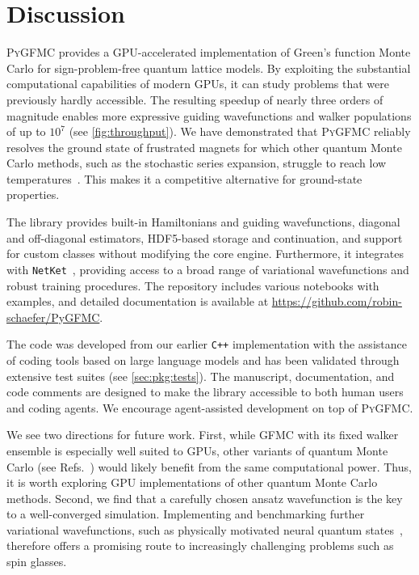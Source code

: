 \documentclass{SciPost}
\providecommand{\PyGFMC}{\textsc{PyGFMC}}
\providecommand{\repo}{\href{https://github.com/robin-schaefer/PyGFMC}{https://github.com/robin-schaefer/PyGFMC}}
\begin{document}
\section{Discussion}\label{sec:discussion}
\PyGFMC{} provides a GPU-accelerated implementation of Green's function Monte Carlo for sign-problem-free quantum lattice models.
%
By exploiting the substantial computational capabilities of modern GPUs, it can study problems that were previously hardly accessible.
%
The resulting speedup of nearly three orders of magnitude enables more expressive guiding wavefunctions and walker populations of up to $10^7$ (see \autoref{fig:throughput}).
%
We have demonstrated that \PyGFMC{} reliably resolves the ground state of frustrated magnets for which other quantum Monte Carlo methods, such as the stochastic series expansion, struggle to reach low temperatures~\cite{kato_numerical_2015,huang_extended_2020}.
%
This makes it a competitive alternative for ground-state properties.

The library provides built-in Hamiltonians and guiding wavefunctions, diagonal and off-diagonal estimators, HDF5-based storage and continuation, and support for custom classes without modifying the core engine.
%
Furthermore, it integrates with \texttt{NetKet}~\cite{SciPostPhysCodeb.7,SciPostPhysCodeb.7-r3.4}, providing access to a broad range of variational wavefunctions and robust training procedures.
%
The repository includes various notebooks with examples, and detailed documentation is available at \repo{}.

The code was developed from our earlier \texttt{C++} implementation with the assistance of coding tools based on large language models and has been validated through extensive test suites (see \autoref{sec:pkg:tests}). 
%
The manuscript, documentation, and code comments are designed to make the library accessible to both human users and coding agents.
%
We encourage agent-assisted development on top of \PyGFMC{}.

We see two directions for future work.
%
First, while GFMC with its fixed walker ensemble is especially well suited to GPUs, other variants of quantum Monte Carlo (see Refs.~\cite{kim_qmcpack_2018,bernaschi_the_2024}) would likely benefit from the same computational power.
%
Thus, it is worth exploring GPU implementations of other quantum Monte Carlo methods.
%
Second, we find that a carefully chosen ansatz wavefunction is the key to a well-converged simulation.
%
Implementing and benchmarking further variational wavefunctions, such as physically motivated neural quantum states~\cite{kufel_approximately_2025}, therefore offers a promising route to increasingly challenging problems such as spin glasses.
\end{document}
